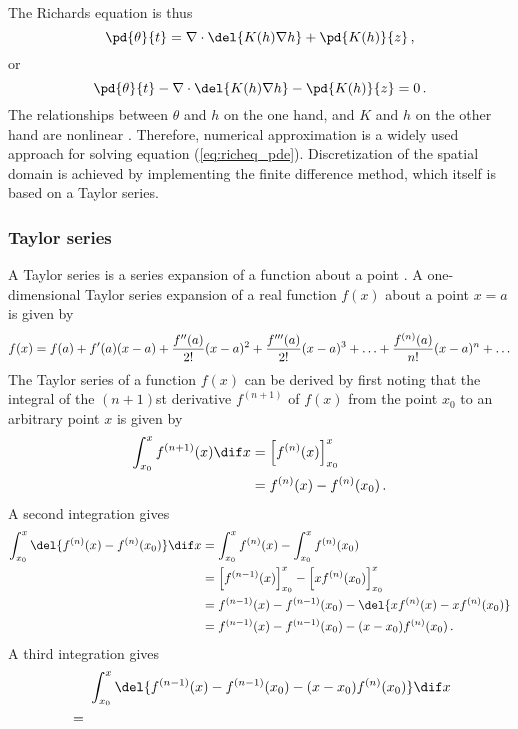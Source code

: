The Richards equation is thus
\begin{equation}
  \label{eq:richeq_simple}
  \pd{\theta}{t} = \nabla \cdot \del{ K(h) \nabla h } + \pd{K(h)}{z} \, ,
\end{equation}
or
\begin{equation}
  \label{eq:richeq_pde}
  \pd{\theta}{t} - \nabla \cdot \del{ K(h) \nabla h } - \pd{K(h)}{z} = 0 \, .
\end{equation}
The relationships between $\theta$ and $h$ on the one hand, and $K$ and $h$ on the other hand are nonlinear \parencite{celia_general_1990}.  Therefore, numerical approximation is a widely used approach for solving equation (\ref{eq:richeq_pde}).  Discretization of the spatial domain is achieved by implementing the finite difference method, which itself is based on a Taylor series.

\subsubsection{Taylor series}
A Taylor series is a series expansion of a function about a point \parencite{Weisstein2017}.  A one-dimensional Taylor series expansion of a real function $f(x)$ about a point $x = a$ is given by
\begin{equation*}
  \label{eq:tayse}
  f(x)=f(a)+f'(a)(x-a)+\frac{f''(a)}{2!}(x-a)^2+\frac{f'''(a)}{2!}(x-a)^3+\mathellipsis+\frac{f^{(n)}(a)}{n!}(x-a)^n+\mathellipsis
\end{equation*}
The Taylor series of a function $f(x)$ can be derived by first noting that the integral of the $(n+1)$st derivative $f^{(n+1)}$ of $f(x)$ from the point $x_0$ to an arbitrary point $x$ is given by
\begin{align*}
  \int_{x_0}^x{f^{(n+1)}(x)\dif x} &= \left[f^{(n)}(x)\right]_{x_0}^x \\
                               &= f^{(n)}(x) - f^{(n)}(x_0) \, .
\end{align*}
A second integration gives
\begin{align*}
  \int_{x_0}^x{\del{ f^{(n)}(x) - f^{(n)}(x_0) }}\dif x &= \int_{x_0}^x{f^{(n)}(x)} - \int_{x_0}^x{f^{(n)}(x_0)} \\
                                                       &= \left[f^{(n-1)}(x)\right]_{x_0}^x - \left[x f^{(n)}(x_0)\right]_{x_0}^x \\
                                                       &= f^{(n-1)}(x) - f^{(n-1)}(x_0) - \del{ x f^{(n)}(x) - x f^{(n)}(x_0) } \\
                                                       &= f^{(n-1)}(x) - f^{(n-1)}(x_0) - (x - x_0) f^{(n)}(x_0) \, .
\end{align*}
A third integration gives
\begin{align*}
  &\makebox[5mm]{}\int_{x_0}^x{\del{ f^{(n-1)}(x) - f^{(n-1)}(x_0) - (x - x_0) f^{(n)}(x_0) }}\dif x \\
&= 
\end{align*}


